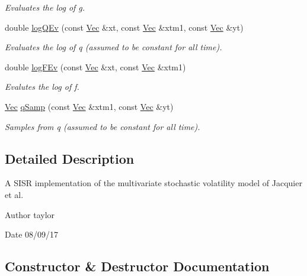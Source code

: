 \begin{DoxyCompactItemize}
\begin{DoxyCompactList}\small\item\em Evaluates the log of g. \end{DoxyCompactList}\item 
double \hyperlink{classJacEtAl_a73a94bbb16389102b20def8c0bdf96d8}{log\+Q\+Ev} (const \hyperlink{pmfs_8h_a4c7df05c6f5e8a0d15ae14bcdbc07152}{Vec} \&xt, const \hyperlink{pmfs_8h_a4c7df05c6f5e8a0d15ae14bcdbc07152}{Vec} \&xtm1, const \hyperlink{pmfs_8h_a4c7df05c6f5e8a0d15ae14bcdbc07152}{Vec} \&yt)
\begin{DoxyCompactList}\small\item\em Evaluates the log of q (assumed to be constant for all time). \end{DoxyCompactList}\item 
double \hyperlink{classJacEtAl_a7742c736cf4136968dcf8629c4a3914e}{log\+F\+Ev} (const \hyperlink{pmfs_8h_a4c7df05c6f5e8a0d15ae14bcdbc07152}{Vec} \&xt, const \hyperlink{pmfs_8h_a4c7df05c6f5e8a0d15ae14bcdbc07152}{Vec} \&xtm1)
\begin{DoxyCompactList}\small\item\em Evalutes the log of f. \end{DoxyCompactList}\item 
\hyperlink{pmfs_8h_a4c7df05c6f5e8a0d15ae14bcdbc07152}{Vec} \hyperlink{classJacEtAl_a2b2696527c89fdf462639e55dfbc67ce}{q\+Samp} (const \hyperlink{pmfs_8h_a4c7df05c6f5e8a0d15ae14bcdbc07152}{Vec} \&xtm1, const \hyperlink{pmfs_8h_a4c7df05c6f5e8a0d15ae14bcdbc07152}{Vec} \&yt)
\begin{DoxyCompactList}\small\item\em Samples from q (assumed to be constant for all time). \end{DoxyCompactList}\end{DoxyCompactItemize}


\subsection{Detailed Description}
A S\+I\+SR implementation of the multivariate stochastic volatility model of Jacquier et al. 

\begin{DoxyAuthor}{Author}
taylor 
\end{DoxyAuthor}
\begin{DoxyDate}{Date}
08/09/17 
\end{DoxyDate}


\subsection{Constructor \& Destructor Documentation}
